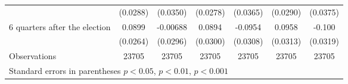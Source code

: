 \begin{table}[!ht]
\begin{tabular}{l*{6}{c}}
                    &    (0.0288)         &    (0.0350)         &    (0.0278)         &    (0.0365)         &    (0.0290)         &    (0.0375)         \\
[0,12em]
 6 quarters after the election&      0.0899\sym{***}&    -0.00688         &      0.0894\sym{**} &     -0.0954\sym{**} &      0.0958\sym{**} &      -0.100\sym{**} \\
                    &    (0.0264)         &    (0.0296)         &    (0.0300)         &    (0.0308)         &    (0.0313)         &    (0.0319)         \\
\hline
Observations        &       23705         &       23705         &       23705         &       23705         &       23705         &       23705         \\
\hline\hline
\multicolumn{7}{l}{ Standard errors in parentheses \sym{*} \(p<0.05\), \sym{**} \(p<0.01\), \sym{***} \(p<0.001\)}\\
\end{tabular}
\end{table}
